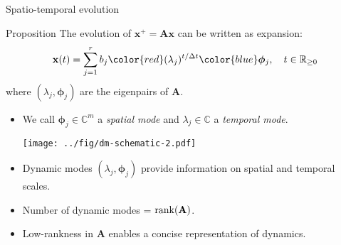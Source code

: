 \documentclass[10pt]{beamer}
\newcommand{\red}{\color{red}}
\newcommand{\blue}{\color{blue}}
\newcommand{\bx}{\mathbf{x}}
\newcommand{\bphi}{\boldsymbol{\phi}}
\newcommand{\bA}{\mathbf{A}}
\newcommand{\bB}{\mathbf{B}}
\newcommand{\bI}{\mathbf{I}}
\newcommand{\bu}{\mathbf{u}}
\newcommand{\rank}{\mathop{\textrm{\textup{rank}}}}
\begin{document}
\begin{frame}{Spatio-temporal evolution}
  \begin{block}{Proposition}
  The evolution of $\bx^+ = \bA \bx $ can be written as expansion:
  \begin{align*}
    \bx(t) = \sum_{j=1}^r b_j{\red (\lambda_j)^{t/\Delta t}}{\blue \bphi_j},\quad t\in\mathbb{R}_{\geq 0}
  \end{align*}
  where $(\lambda_j,\bphi_j)$ are the eigenpairs of $\bA$.
  \end{block}
  \begin{itemize}    
  \item We call {\blue $\bphi_j\in\mathbb{C}^{m}$ a {\em spatial mode}} and {\red $\lambda_j\in\mathbb{C}$ a {\em temporal mode}}.
    \vspace{0.05in}
    \begin{center}
      \texttt{[image: ../fig/dm-schematic-2.pdf]}
    \end{center}
  \item Dynamic modes $(\lambda_j,\bphi_j)$  provide information on spatial and temporal scales.
    \vspace{0.1in}
  \item Number of dynamic modes = {\blue\em $\rank(\bA)$}.
    \vspace{0.1in}
  \item Low-rankness in $\bA$ enables a {\blue concise representation of dynamics}.
  \end{itemize}
\end{frame}
\end{document}
